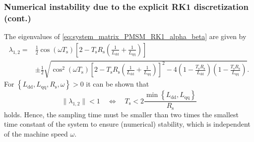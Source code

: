 \begin{frame}
    \frametitle{Numerical instability due to the explicit RK1 discretization (cont.)}
    The eigenvalues of \eqref{eq:system_matrix_PMSM_RK1_alpha_beta} are given by
    \begin{equation}
        \begin{split}
            \lambda_{1,2} = &
            \frac{1}{2}
            \cos\!\left(\omega T_\mathrm{s}\right)
            \left[
                2
                -
                T_\mathrm{s}R_\mathrm{s}
                \left(
                \frac{1}{L_{\mathrm{dd}}}
                +
                \frac{1}{L_{\mathrm{qq}}}
                \right)
                \right] \\
                            & \pm
            \frac{1}{2}
            \sqrt{
                \cos^2\!\left(\omega T_\mathrm{s}\right)
                \left[
                    2
                    -
                    T_\mathrm{s}R_\mathrm{s}
                    \left(
                    \frac{1}{L_{\mathrm{dd}}}
                    +
                    \frac{1}{L_{\mathrm{qq}}}
                    \right)
                    \right]^2
                -
                4
                \left(
                1-\frac{T_\mathrm{s}R_\mathrm{s}}{L_{\mathrm{dd}}}
                \right)
                \left(
                1-\frac{T_\mathrm{s}R_\mathrm{s}}{L_{\mathrm{qq}}}
                \right)
            }.
        \end{split}
    \end{equation}\pause%
    For $\left\{L_{\mathrm{dd}}, L_{\mathrm{qq}}, R_\mathrm{s}, \omega \right\}> 0$ it can be shown that
    \begin{equation}
        \|\lambda_{1,2}\| < 1 \quad \Leftrightarrow \quad T_\mathrm{s} < 2\frac{\min\left\{L_\mathrm{dd}, L_\mathrm{qq}\right\}}{R_\mathrm{s}}
    \end{equation}
    holds. \pause Hence, the sampling time must be smaller than two times the smallest time constant of the system to ensure (numerical) stability, which is independent of the machine speed $\omega$.
\end{frame}

